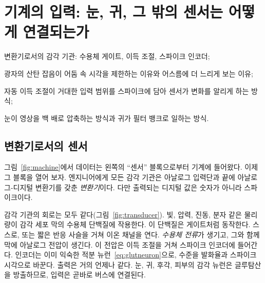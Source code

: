 \chapter{기계의 입력: 눈, 귀, 그 밖의 센서는 어떻게 연결되는가}
\label{sec:sensors}
\begin{chaptergoals}
\item 변환기로서의 감각 기관: 수용체 게이트, 이득 조절, 스파이크 인코더;
\item 광자의 산탄 잡음이 어둠 속 시각을 제한하는 이유와 어스름에 더 느리게 보는 이유;
\item 자동 이득 조절이 거대한 입력 범위를 스파이크에 담아 센서가 변화를 알리게 하는 방식;
\item 눈이 영상을 백 배로 압축하는 방식과 귀가 필터 뱅크로 일하는 방식.
\end{chaptergoals}

\section{변환기로서의 센서}

그림~\ref{fig:machine}에서 데이터는 왼쪽의 “센서” 블록으로부터 기계에 들어왔다. 이제 그 블록을 열어 보자. 엔지니어에게 모든 감각 기관은 아날로그 입력단과 끝에 아날로그-디지털 변환기를 갖춘 \emph{변환기}이다. 다만 출력되는 디지털 값은 숫자가 아니라 스파이크이다.

감각 기관의 회로는 모두 같다(그림~\ref{fig:transducer}). 빛, 압력, 진동, 분자 같은 물리량이 감각 세포 막의 수용체 단백질에 작용한다. 이 단백질은 게이트처럼 동작한다. 스스로, 또는 짧은 반응 사슬을 거쳐 이온 채널을 연다. \emph{수용체 전류}가 생기고, 그와 함께 막에 아날로그 전압이 생긴다. 이 전압은 이득 조절을 거쳐 스파이크 인코더에 들어간다. 인코더는 이미 익숙한 적분 뉴런~\eqref{eq:glutneuron}으로, 수준을 발화율과 스파이크 시각으로 바꾼다. 출력은 거의 언제나 같다. 눈, 귀, 후각, 피부의 감각 뉴런은 글루탐산을 방출하므로, 입력은 곧바로  버스에 연결된다.

